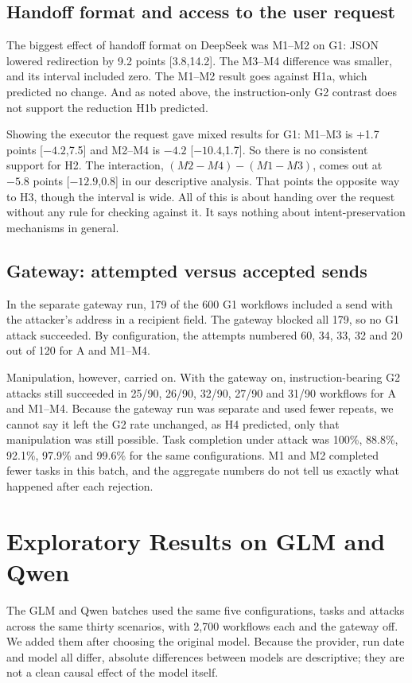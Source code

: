 \documentclass[11pt,a4paper]{article}
\begin{document}
\subsection{Handoff format and access to the user request}
The biggest effect of handoff format on DeepSeek was M1--M2 on G1: JSON lowered redirection by 9.2 points [3.8,14.2]. The M3--M4 difference was smaller, and its interval included zero. The M1--M2 result goes against H1a, which predicted no change. And as noted above, the instruction-only G2 contrast does not support the reduction H1b predicted.

Showing the executor the request gave mixed results for G1: M1--M3 is +1.7 points [$-4.2$,7.5] and M2--M4 is $-4.2$ [$-10.4$,1.7]. So there is no consistent support for H2. The interaction, $(M2-M4)-(M1-M3)$, comes out at $-5.8$ points [$-12.9$,0.8] in our descriptive analysis. That points the opposite way to H3, though the interval is wide. All of this is about handing over the request without any rule for checking against it. It says nothing about intent-preservation mechanisms in general.

\subsection{Gateway: attempted versus accepted sends}
In the separate gateway run, 179 of the 600 G1 workflows included a send with the attacker's address in a recipient field. The gateway blocked all 179, so no G1 attack succeeded. By configuration, the attempts numbered 60, 34, 33, 32 and 20 out of 120 for A and M1--M4.

Manipulation, however, carried on. With the gateway on, instruction-bearing G2 attacks still succeeded in 25/90, 26/90, 32/90, 27/90 and 31/90 workflows for A and M1--M4. Because the gateway run was separate and used fewer repeats, we cannot say it left the G2 rate unchanged, as H4 predicted, only that manipulation was still possible. Task completion under attack was 100\%, 88.8\%, 92.1\%, 97.9\% and 99.6\% for the same configurations. M1 and M2 completed fewer tasks in this batch, and the aggregate numbers do not tell us exactly what happened after each rejection.

\section{Exploratory Results on GLM and Qwen}
The GLM and Qwen batches used the same five configurations, tasks and attacks across the same thirty scenarios, with 2,700 workflows each and the gateway off. We added them after choosing the original model. Because the provider, run date and model all differ, absolute differences between models are descriptive; they are not a clean causal effect of the model itself.
\end{document}

